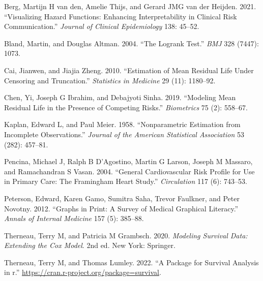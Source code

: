 \documentclass{article}
\newlength{\cslhangindent}
\newenvironment{CSLReferences}[2] %
 {\begin{list}{}{%
  \setlength{\itemindent}{0pt}
  \setlength{\leftmargin}{0pt}
  \setlength{\parsep}{0pt}
  \ifodd #1
   \setlength{\leftmargin}{\cslhangindent}
   \setlength{\itemindent}{-1\cslhangindent}
  \fi
  \setlength{\itemsep}{#2\baselineskip}}}
 {\end{list}}
\begin{document}
\label{refs}
\begin{CSLReferences}{1}{0}
Berg, Martijn H van den, Amelie Thijs, and Gerard JMG van der Heijden. 2021. {``Visualizing Hazard Functions: Enhancing Interpretability in Clinical Risk Communication.''} \emph{Journal of Clinical Epidemiology} 138: 45--52.

Bland, Martin, and Douglas Altman. 2004. {``The Logrank Test.''} \emph{BMJ} 328 (7447): 1073.

Cai, Jianwen, and Jiajia Zheng. 2010. {``Estimation of Mean Residual Life Under Censoring and Truncation.''} \emph{Statistics in Medicine} 29 (11): 1180--92.

Chen, Yi, Joseph G Ibrahim, and Debajyoti Sinha. 2019. {``Modeling Mean Residual Life in the Presence of Competing Risks.''} \emph{Biometrics} 75 (2): 558--67.

Kaplan, Edward L, and Paul Meier. 1958. {``Nonparametric Estimation from Incomplete Observations.''} \emph{Journal of the American Statistical Association} 53 (282): 457--81.

Pencina, Michael J, Ralph B D'Agostino, Martin G Larson, Joseph M Massaro, and Ramachandran S Vasan. 2004. {``General Cardiovascular Risk Profile for Use in Primary Care: The Framingham Heart Study.''} \emph{Circulation} 117 (6): 743--53.

Peterson, Edward, Karen Gamo, Sumitra Saha, Trevor Faulkner, and Peter Novotny. 2012. {``Graphs in Print: A Survey of Medical Graphical Literacy.''} \emph{Annals of Internal Medicine} 157 (5): 385--88.

Therneau, Terry M, and Patricia M Grambsch. 2020. \emph{Modeling Survival Data: Extending the Cox Model}. 2nd ed. New York: Springer.

Therneau, Terry M, and Thomas Lumley. 2022. {``A Package for Survival Analysis in r.''} \url{https://cran.r-project.org/package=survival}.

\end{CSLReferences}



\end{document}
